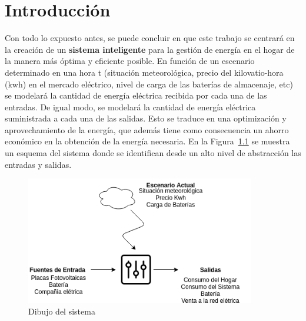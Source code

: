 \chapter{Introducción}
\label{cap:Introduccion}
Con todo lo expuesto antes, se puede concluir en que este trabajo se centrará en la creación de un \textbf{sistema inteligente} para la gestión de energía en el hogar de la manera más óptima y eficiente posible. En función de un escenario determinado en una hora t (situación meteorológica, precio del kilovatio-hora (kwh) en el mercado eléctrico, nivel de carga de las baterías de almacenaje, etc) se modelará la cantidad de energía eléctrica recibida por cada una de las entradas. De igual modo, se modelará la cantidad de energía eléctrica suministrada a cada una de las salidas. Esto se traduce en una optimización y aprovechamiento de la energía, que además tiene como consecuencia un ahorro económico en la obtención de la energía necesaria.
En la Figura~\ref{fig:abstract} se muestra un esquema del sistema donde se identifican desde un alto nivel de abstracción las entradas y salidas.\\

\begin{figure}[!h]
	\centering
	\includegraphics[width=10cm]{figs/Abstract.png}
	\caption{Dibujo del sistema}
        \label{fig:abstract}
\end{figure}
